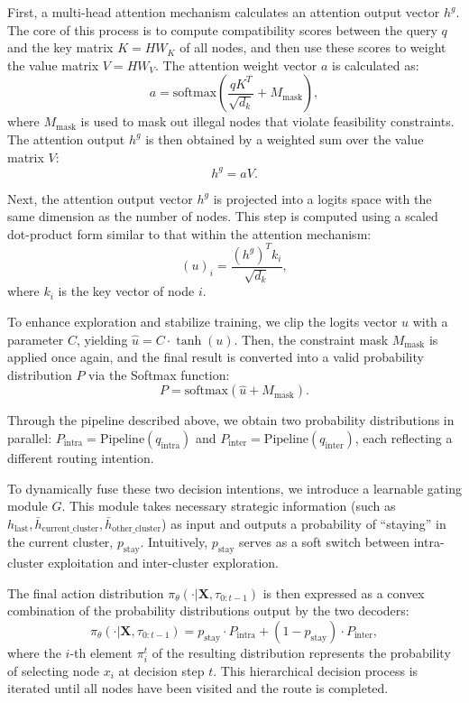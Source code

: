 \documentclass[pdflatex,sn-basic,Numbered]{sn-jnl}
\begin{document}
First, a multi-head attention mechanism calculates an attention output vector $h^g$. The core of this process is to compute compatibility scores between the query $q$ and the key matrix $K=HW_K$ of all nodes, and then use these scores to weight the value matrix $V=HW_V$. The attention weight vector $a$ is calculated as:
    \begin{equation}
        a = \text{softmax}\left(\frac{q K^T}{\sqrt{d_k}} + M_{\text{mask}}\right),
    \end{equation}
    where $M_{\text{mask}}$ is used to mask out illegal nodes that violate feasibility constraints. The attention output $h^g$ is then obtained by a weighted sum over the value matrix $V$:
    \begin{equation}
        h^g = aV.
    \end{equation}

Next, the attention output vector $h^g$ is projected into a logits space with the same dimension as the number of nodes. This step is computed using a scaled dot-product form similar to that within the attention mechanism:
    \begin{equation}
        (u)_i = \frac{(h^g)^T k_i}{\sqrt{d_k}},
    \end{equation}
    where $k_i$ is the key vector of node $i$.

To enhance exploration and stabilize training, we clip the logits vector $u$ with a parameter $C$, yielding $\hat{u} = C \cdot \tanh(u)$. Then, the constraint mask $M_{\text{mask}}$ is applied once again, and the final result is converted into a valid probability distribution $P$ via the Softmax function:
\[
    P = \text{softmax}(\hat{u} + M_{\text{mask}}).
\]

Through the pipeline described above, we obtain two probability distributions in parallel: $P_{\text{intra}} = \text{Pipeline}(q_{\text{intra}})$ and $P_{\text{inter}} = \text{Pipeline}(q_{\text{inter}})$, each reflecting a different routing intention.

To dynamically fuse these two decision intentions, we introduce a learnable gating module $G$. This module takes necessary strategic information (such as $h_{\text{last}}, \bar{h}_{\text{current\_cluster}}, \bar{h}_{\text{other\_cluster}}$) as input and outputs a probability of ``staying'' in the current cluster, $p_{\text{stay}}$. Intuitively, $p_{\text{stay}}$ serves as a soft switch between intra-cluster exploitation and inter-cluster exploration.

The final action distribution $\pi_{\theta}(\cdot|\mathbf{X}, \tau_{0:t-1})$ is then expressed as a convex combination of the probability distributions output by the two decoders:
\begin{equation}
    \pi_{\theta}(\cdot|\mathbf{X}, \tau_{0:t-1}) = p_{\text{stay}} \cdot P_{\text{intra}} + (1 - p_{\text{stay}}) \cdot P_{\text{inter}},
\end{equation}
where the $i$-th element $\pi_i^t$ of the resulting distribution represents the probability of selecting node $x_i$ at decision step $t$. This hierarchical decision process is iterated until all nodes have been visited and the route is completed.
\end{document}
